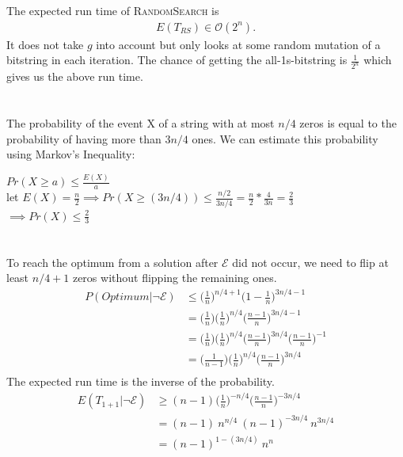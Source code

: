 \documentclass[12pt,a4paper]{article}
\begin{document}
\section{}
The expected run time of \textsc{RandomSearch} is
\begin{align*}
E(T_{RS}) \in \mathcal{O}(2^n).
\end{align*}
It does not take $g$ into account but only looks at some random mutation of a bitstring in each iteration. The chance of getting the all-1s-bitstring is $\frac{1}{2^n}$ which gives us the above run time.


\section{}
The probability of the event X of a string with at most  $n/4$ zeros is equal to the probability of having more than  $3n/4$ ones. We can estimate this probability using Markov's Inequality:
\begin{center}

 $Pr(X \geq a) \leq \frac{E(X)}{a}$\\
 \bigskip
 let $E(X) = \frac{n}{2} \implies Pr(X \geq (3n/4)) \leq \frac{n/2}{3n/4} = \frac{n}{2} * \frac{4}{3n} = \frac{2}{3} $ \\
 \bigskip
 $\implies Pr(X) \leq \frac{2}{3}$

\end{center}

\section{}
To reach the optimum from a solution after $\mathcal{E}$ did not occur, we need to flip at least $n/4+1$ zeros without flipping the remaining ones.
\begin{align*}
 P(Optimum|\neg\mathcal{E}) &\leq \Big(\frac{1}{n}\Big)^{n/4+1} \Big(1-\frac{1}{n}\Big)^{3n/4-1} \\
 &= \Big(\frac{1}{n}\Big) \Big(\frac{1}{n}\Big)^{n/4} \Big(\frac{n-1}{n}\Big)^{3n/4-1} \\
 &= \Big(\frac{1}{n}\Big) \Big(\frac{1}{n}\Big)^{n/4} \Big(\frac{n-1}{n}\Big)^{3n/4}\Big(\frac{n-1}{n}\Big)^{-1} \\
 &= \Big(\frac{1}{n-1}\Big) \Big(\frac{1}{n}\Big)^{n/4} \Big(\frac{n-1}{n}\Big)^{3n/4} \\
\end{align*}
The expected run time is the inverse of the probability.
\begin{align*}
 E(T_{1+1}|\neg \mathcal{E}) &\geq (n-1) \Big(\frac{1}{n}\Big)^{-n/4} \Big(\frac{n-1}{n}\Big)^{-3n/4} \\
  &= (n-1)\ n^{n/4}\ (n-1)^{-3n/4}\ n^{3n/4} \\
  &= (n-1)^{1-(3n/4)}\ n^{n} \\
\end{align*}
\end{document}

